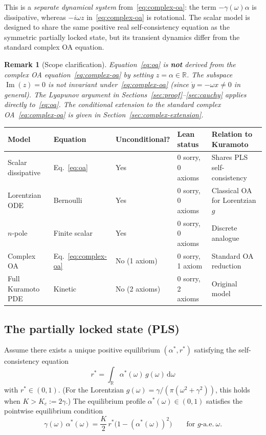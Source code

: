 \documentclass[11pt,a4paper]{article}
\newtheorem{remark}[theorem]{Remark}
\theoremstyle{definition}
\DeclareMathOperator{\im}{Im}
\newcommand{\R}{\mathbb{R}}
\begin{document}
This is a \emph{separate dynamical system} from~\eqref{eq:complex-oa}: the term $-\gamma(\omega)\alpha$ is dissipative, whereas $-i\omega z$ in~\eqref{eq:complex-oa} is rotational. The scalar model is designed to share the same positive real self-consistency equation as the symmetric partially locked state, but its transient dynamics differ from the standard complex OA equation.

\begin{remark}[Scope clarification]\label{rem:scope}
Equation~\eqref{eq:oa} is \textbf{not} derived from the complex OA equation~\eqref{eq:complex-oa} by setting $z = \alpha \in \R$. The subspace $\im(z) = 0$ is not invariant under~\eqref{eq:complex-oa} (since $\dot{y} = -\omega x \neq 0$ in general). The Lyapunov argument in Sections~\ref{sec:proof}--\ref{sec:cauchy} applies directly to~\eqref{eq:oa}. The conditional extension to the standard complex OA~\eqref{eq:complex-oa} is given in Section~\ref{sec:complex-extension}.
\end{remark}

\begin{center}\small
\begin{tabular}{lllll}
\textbf{Model} & \textbf{Equation} & \textbf{Unconditional?} & \textbf{Lean status} & \textbf{Relation to Kuramoto} \\
\hline
Scalar dissipative & Eq.~\eqref{eq:oa} & Yes & 0 sorry, 0 axioms & Shares PLS self-consistency \\
Lorentzian ODE & Bernoulli & Yes & 0 sorry, 0 axioms & Classical OA for Lorentzian $g$ \\
$n$-pole & Finite scalar & Yes & 0 sorry, 0 axioms & Discrete analogue \\
Complex OA & Eq.~\eqref{eq:complex-oa} & No (1 axiom) & 0 sorry, 1 axiom & Standard OA reduction \\
Full Kuramoto PDE & Kinetic & No (2 axioms) & 0 sorry, 2 axioms & Original model \\
\end{tabular}
\end{center}

\subsection{The partially locked state (PLS)}

Assume there exists a unique positive equilibrium $(\alpha^*, r^*)$ satisfying the self-consistency equation
\begin{equation}\label{eq:sc}
r^* = \int_\R \alpha^*(\omega)\,g(\omega)\,\mathrm{d}\omega
\end{equation}
with $r^* \in (0,1)$. (For the Lorentzian $g(\omega) = \gamma/(\pi(\omega^2+\gamma^2))$, this holds when $K > K_c := 2\gamma$.) The equilibrium profile $\alpha^*(\omega) \in (0,1)$ satisfies the pointwise equilibrium condition
\begin{equation}\label{eq:equil}
\gamma(\omega)\,\alpha^*(\omega) = \frac{K}{2}\,r^*\bigl(1 - (\alpha^*(\omega))^2\bigr) \qquad \text{for $g$-a.e.}\ \omega.
\end{equation}
\end{document}
